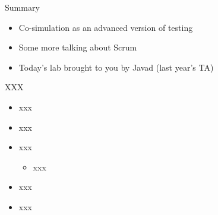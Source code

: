 \begin{frame}[fragile]{Summary}
\begin{itemize}
\item Co-simulation as an advanced version of testing
\item Some more talking about Scrum
\item Today's lab brought to you by Javad (last year's TA)
\end{itemize}
\end{frame}




\begin{frame}[fragile]{XXX}
\begin{itemize}
\item xxx
\item xxx
\item xxx
\begin{itemize}
\item xxx
\end{itemize}
\item xxx
\item xxx
\end{itemize}
\end{frame}
